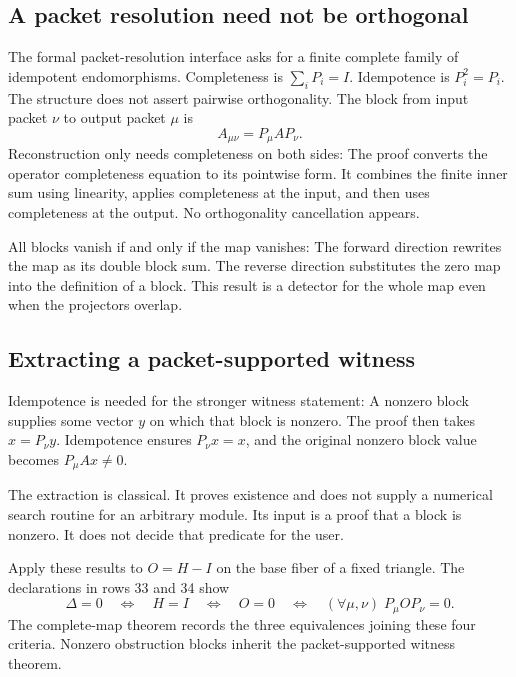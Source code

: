 \subsection{A packet resolution need not be orthogonal}
The formal packet-resolution interface asks for a finite complete family of idempotent endomorphisms.
Completeness is $\sum_iP_i=I$. Idempotence is $P_i^2=P_i$. The structure does not assert pairwise orthogonality. The block from input packet $\nu$ to output packet $\mu$ is
\[
 A_{\mu\nu}=P_\mu A P_\nu.
\]
Reconstruction only needs completeness on both sides:
The proof converts the operator completeness equation to its pointwise form. It combines the finite inner sum using linearity, applies completeness at the input, and then uses completeness at the output. No orthogonality cancellation appears.

All blocks vanish if and only if the map vanishes:
The forward direction rewrites the map as its double block sum. The reverse direction substitutes the zero map into the definition of a block. This result is a detector for the whole map even when the projectors overlap.

\subsection{Extracting a packet-supported witness}
Idempotence is needed for the stronger witness statement:
A nonzero block supplies some vector $y$ on which that block is nonzero. The proof then takes $x=P_\nu y$. Idempotence ensures $P_\nu x=x$, and the original nonzero block value becomes $P_\mu Ax\ne0$.

The extraction is classical. It proves existence and does not supply a numerical search routine for an arbitrary module. Its input is a proof that a block is nonzero. It does not decide that predicate for the user.

Apply these results to $O=H-I$ on the base fiber of a fixed triangle. The declarations in rows 33 and 34 show
\[
 \Delta=0\quad\Longleftrightarrow\quad H=I
 \quad\Longleftrightarrow\quad O=0
 \quad\Longleftrightarrow\quad
 (\forall\mu,\nu)\;P_\mu O P_\nu=0.
\]
The complete-map theorem  records the three equivalences joining these four criteria. Nonzero obstruction blocks inherit the packet-supported witness theorem.

